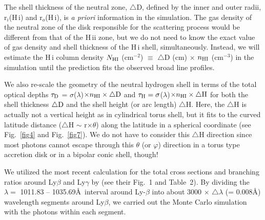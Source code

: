 \documentclass[a4paper,fleqn,usenatbib,useAMS]{mnras}
\def\ha{H{$\alpha$}}
\def\hi{H\,{\sc i}}
\def\hii{H\,{\sc ii}}
\begin{document}
{The shell thickness of the neutral zone, $\triangle$D, defined by the inner and outer radii, r$_{i}$({\hi}) and r$_o$({\hi}), is {\it a priori} information in the simulation. The gas density of the neutral zone of the disk responsible for the scattering process would be different from that of the {\hii} zone, but we do not need to know the exact value of gas density and shell thickness of the {\hi} shell, simultaneously. Instead, we will estimate the {\hi} column density $N_{\rm HI}$ (cm$^{-2}$) $\equiv$ {$\triangle$}D (cm) $\times$ $n_{\rm HI}$ (cm$^{-3}$) in the simulation until the prediction fits the observed broad line profiles.

We also re-scale the geometry of the neutral hydrogen shell {in terms of the total optical depths  $\tau_{\rm D}$ = $\sigma$($\lambda$)$\times n_{\rm HI}\times\triangle {\rm D}$  and   $\tau_{\rm H} = \sigma$($\lambda$)$\times n_{\rm HI}\times\triangle \rm H$ for both the shell thickness $\triangle {\rm D}$ and the shell height  (or arc length)} $\triangle$H. Here, the $\triangle$H is  actually not a vertical height as in cylindrical torus shell, but it fits to the curved latitude distance ($\triangle$H $\sim$ r$\times \theta$) along the latitude in a spherical coordinate (see Fig.~\ref{fig4} and Fig.~\ref{fig7}). We do not have to consider this $\triangle$H direction since most photons cannot escape through this  $\theta$ (or $\varphi$) direction in a torus type accretion disk  or in a bipolar conic shell, though!

We utilized the most recent calculation for the total cross sections and branching ratios around Ly$\beta$ and Ly$\gamma$ by \citet{cha15} (see their Fig.~1 and Table~2). By dividing  the $\lambda = $ 1011.83 -- 1035.69\AA\, interval around Ly-$\beta$ into about 3000 $\times$ $\triangle\lambda$ (= 0.008\AA) wavelength segments  around Ly$\beta$, we carried out the Monte Carlo simulation with the photons within each segment.

}
\end{document}
